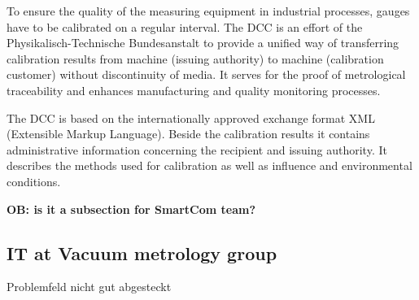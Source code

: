 \documentclass[3p,times,procedia]{elsarticle}
\begin{document}
To ensure the quality of the measuring equipment in industrial
processes, gauges have to be calibrated on a regular interval. The
DCC is an effort of the Physikalisch-Technische Bundesanstalt to provide
a unified way of transferring calibration results from machine (issuing authority) to
machine (calibration customer) without discontinuity of media. It
serves for the proof of metrological traceability and enhances 
manufacturing and quality monitoring processes.

The DCC is based on the internationally approved exchange format
XML (Extensible Markup Language). Beside the calibration results it
contains administrative information concerning the recipient and
issuing authority. It describes the methods used for calibration as well as
influence and environmental conditions.






\textbf{OB: is it a subsection for SmartCom team?}

\subsection{IT at Vacuum metrology group}


Problemfeld nicht gut abgesteckt
\end{document}
